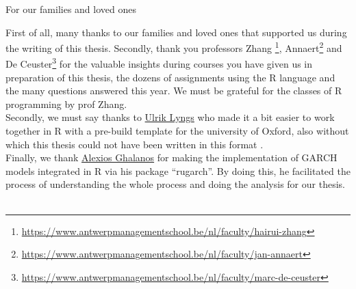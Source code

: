 \documentclass[a4paper, nobind]{templates/ociamthesis}
\begin{document}
\setcounter{secnumdepth}{2}
\setcounter{tocdepth}{2}



\begin{romanpages}

\maketitle

\begin{dedication}
  For our families and loved ones
\end{dedication}

\begin{acknowledgements}
 	First of all, many thanks to our families and loved ones that supported us during the writing of this thesis. Secondly, thank you professors Zhang \footnote{\url{https://www.antwerpmanagementschool.be/nl/faculty/hairui-zhang}}, Annaert\footnote{\url{https://www.antwerpmanagementschool.be/nl/faculty/jan-annaert}} and De Ceuster\footnote{\url{https://www.antwerpmanagementschool.be/nl/faculty/marc-de-ceuster}} for the valuable insights during courses you have given us in preparation of this thesis, the dozens of assignments using the R language and the many questions answered this year. We must be grateful for the classes of R programming by prof Zhang. ~\\

  \noindent Secondly, we must say thanks to \href{https://www.cs.ox.ac.uk/people/ulrik.lyngs/}{Ulrik Lyngs} who made it a bit easier to work together in R with a pre-build template for the university of Oxford, also without which this thesis could not have been written in this format \autocite{lyngsOxforddown2019}. ~\\

  \noindent Finally, we thank \href{https://www.linkedin.com/in/alexios-galanos-64309165/}{Alexios Ghalanos} for making the implementation of GARCH models integrated in R via his package ``rugarch''. By doing this, he facilitated the process of understanding the whole process and doing the analysis for our thesis. ~\\


\end{acknowledgements}
\end{romanpages}
\end{document}
